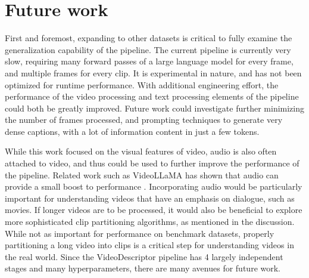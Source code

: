 \section{Future work}

First and foremost, expanding to other datasets is critical to fully examine the generalization capability of the pipeline.
The current pipeline is currently very slow, requiring many forward passes of a large language model for every frame, and multiple frames for every clip.
It is experimental in nature, and has not been optimized for runtime performance.
With additional engineering effort, the performance of the video processing and text processing elements of the pipeline could both be greatly improved.
Future work could investigate further minimizing the number of frames processed, and prompting techniques to generate very dense captions, with a lot of information content in just a few tokens.

While this work focused on the visual features of video, audio is also often attached to video, and thus could be used to further improve the performance of the pipeline.
Related work such as VideoLLaMA has shown that audio can provide a small boost to performance \cite{videollama}.
Incorporating audio would be particularly important for understanding videos that have an emphasis on dialogue, such as movies.
If longer videos are to be processed, it would also be beneficial to explore more sophisticated clip partitioning algorithms, as mentioned in the discussion.
While not as important for performance on benchmark datasets, properly partitioning a long video into clips is a critical step for understanding videos in the real world.
Since the VideoDescriptor pipeline has 4 largely independent stages and many hyperparameters, there are many avenues for future work.
